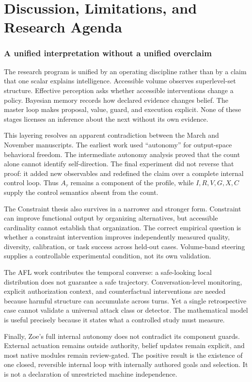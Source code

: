 \clearpage
\part{Discussion, Limitations, and Research Agenda}

\section{A unified interpretation without a unified overclaim}
The research program is unified by an operating discipline rather than by a claim that one scalar explains intelligence. Accessible volume observes superlevel-set structure. Effective perception asks whether accessible interventions change a policy. Bayesian memory records how declared evidence changes belief. The master loop makes proposal, value, guard, and execution explicit. None of these stages licenses an inference about the next without its own evidence.

This layering resolves an apparent contradiction between the March and November manuscripts. The earliest work used ``autonomy'' for output-space behavioral freedom. The intermediate autonomy analysis proved that the count alone cannot identify self-direction. The final experiment did not reverse that proof: it added new observables and redefined the claim over a complete internal control loop. Thus $A_\tau$ remains a component of the profile, while $I,R,V,G,X,C$ supply the control semantics absent from the count.

The Constraint thesis also survives in a narrower and stronger form. Constraint can improve functional output by organizing alternatives, but accessible cardinality cannot establish that organization. The correct empirical question is whether a constraint intervention improves independently measured quality, diversity, calibration, or task success across held-out cases. Volume-band steering supplies a controllable experimental condition, not its own validation.

The AFL work contributes the temporal converse: a safe-looking local distribution does not guarantee a safe trajectory. Conversation-level monitoring, explicit authorization context, and counterfactual interventions are needed because harmful structure can accumulate across turns. Yet a single retrospective case cannot validate a universal attack class or detector. The mathematical model is useful precisely because it states what a controlled study must measure.

Finally, Zoe's full internal autonomy does not contradict its component guards. External actuation remains outside authority, belief updates remain explicit, and most native modules remain review-gated. The positive result is the existence of one closed, reversible internal loop with internally authored goals and selection. It is not a declaration of unrestricted machine independence.

